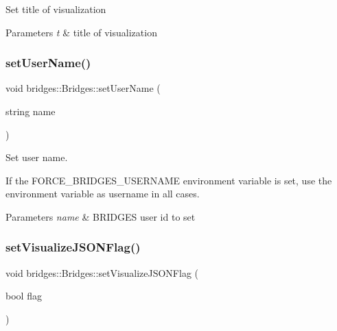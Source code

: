 Set title of visualization


\begin{DoxyParams}{Parameters}
{\em t} & title of visualization \\
\hline
\end{DoxyParams}
\mbox{\label{classbridges_1_1_bridges_a383c5c1d3c85541f466e0cb60dde1c29}} 
\subsubsection{\texorpdfstring{set\+User\+Name()}{setUserName()}}
{\footnotesize\ttfamily void bridges\+::\+Bridges\+::set\+User\+Name (\begin{DoxyParamCaption}\item[{string}]{name }\end{DoxyParamCaption})\hspace{0.3cm}{\ttfamily [inline]}}



Set user name. 

If the F\+O\+R\+C\+E\+\_\+\+B\+R\+I\+D\+G\+E\+S\+\_\+\+U\+S\+E\+R\+N\+A\+ME environment variable is set, use the environment variable as username in all cases.


\begin{DoxyParams}{Parameters}
{\em name} & B\+R\+I\+D\+G\+ES user id to set \\
\hline
\end{DoxyParams}
\mbox{\label{classbridges_1_1_bridges_a69aca37ab2729d0345e0549d7baf0423}} 
\subsubsection{\texorpdfstring{set\+Visualize\+J\+S\+O\+N\+Flag()}{setVisualizeJSONFlag()}}
{\footnotesize\ttfamily void bridges\+::\+Bridges\+::set\+Visualize\+J\+S\+O\+N\+Flag (\begin{DoxyParamCaption}\item[{bool}]{flag }\end{DoxyParamCaption})\hspace{0.3cm}{\ttfamily [inline]}}


